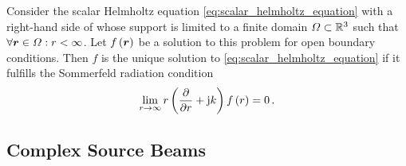 
\begin{theorem}
	\label{sommerfeld_radiation_condition}
	Consider the scalar Helmholtz equation \eqref{eq:scalar_helmholtz_equation}
	with a right-hand side of whose support is limited to a finite domain
	$\Omega \subset \mathbb{R}^3$ such that $\forall \pvec{r} \in \Omega: r < \infty$.
	Let $f \left( \pvec{r} \right)$ be a solution to this problem for open 
	boundary conditions.
	Then $f$ is the unique solution to \eqref{eq:scalar_helmholtz_equation}
	if it fulfills the Sommerfeld radiation condition 
	\begin{equation}
		\lim_{r \to \infty}
		r \left( \frac{\partial}{\partial r} + \mathrm{j} k \right) f \left( r \right) = 0 \, .
	\end{equation}
\end{theorem}









\subsection{Complex Source Beams}




